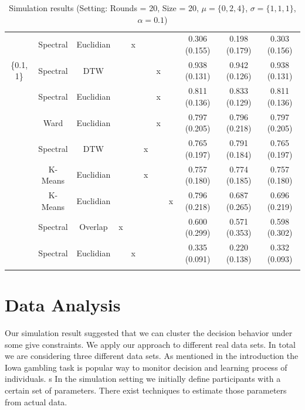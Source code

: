 \documentclass[12pt,a4paper,bibliography=totocnumbered,listof=totocnumbered]{scrartcl}
\begin{document}
\begin{table}[!htbp]
\begin{tabularx}{\textwidth}{ ccccccccccc}
		& Spectral & Euclidian &  & x &  &  &  & 0.306 (0.155) & 0.198 (0.179) & 0.303 (0.156) \\ 
		\{0.1, 1\} & Spectral & DTW &  &  &  & x &  & 0.938 (0.131) & 0.942 (0.126) & 0.938 (0.131) \\ 
		& Spectral & Euclidian &  &  &  & x &  & 0.811 (0.136) & 0.833 (0.129) & 0.811 (0.136) \\ 
		& Ward  & Euclidian &  &  &  & x &  & 0.797 (0.205) & 0.796 (0.218) & 0.797 (0.205) \\ 
		& Spectral & DTW &  &  & x &  &  & 0.765 (0.197) & 0.791 (0.184) & 0.765 (0.197) \\ 
		& K-Means & Euclidian &  &  & x &  &  & 0.757 (0.180) & 0.774 (0.185) & 0.757 (0.180) \\ 
		& K-Means & Euclidian &  &  &  &  & x & 0.796 (0.218) & 0.687 (0.265) & 0.696 (0.219) \\ 
		& Spectral & Overlap & x &  &  &  &  & 0.600 (0.299) & 0.571 (0.353) & 0.598 (0.302) \\ 
		& Spectral & Euclidian &  & x &  &  &  & 0.335 (0.091) & 0.220 (0.138) & 0.332 (0.093) \\ 
		\hline \\
	\end{tabularx} 
	\caption{Simulation results (Setting: Rounds = 20, Size = 20, $\mu = \{0,2,4\}$, $\sigma =  \{1,1,1\}$, $\alpha = 0.1$)} 
\end{table} 









\section{Data Analysis}

Our simulation result suggested that we can cluster the decision behavior under some give constraints. We apply our approach to different real data sets. In total we are considering three different data sets. As mentioned in the introduction the Iowa gambling task is popular way to monitor decision and learning process of individuals. s
In the simulation setting we initially define participants with a certain set of parameters. There exist techniques to estimate those parameters from actual data. 
\end{document}
